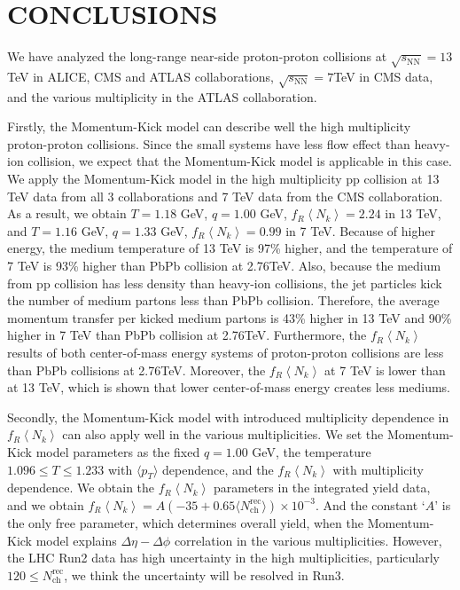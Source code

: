 \documentclass[jkps,fleqn,showpacs,showkeys]{revtex4}
\begin{document}
\section*{CONCLUSIONS}
\label{sec:Conclusion}


We have analyzed the long-range near-side proton-proton collisions at $\sqrt{s_\text{NN}}=13$TeV in ALICE, CMS and ATLAS collaborations\cite{alice, cms, atlas}, $\sqrt{s_\text{NN}}=7$TeV in CMS data\cite{cms}, and the various multiplicity in the ATLAS collaboration\cite{atlas}.

Firstly, the Momentum-Kick model can describe well the high multiplicity proton-proton collisions.
Since the small systems have less flow effect than heavy-ion collision, we expect that the Momentum-Kick model is applicable in this case.
We apply the Momentum-Kick model in the high multiplicity pp collision at 13 TeV data from all 3 collaborations and 7 TeV data from the CMS collaboration. 
As a result, we obtain $T=1.18$ GeV, $q=1.00$ GeV, $f_R\left\langle N_k \right\rangle = 2.24$ in 13 TeV, and $T=1.16$ GeV, $q=1.33$ GeV, $f_R\left\langle N_k \right\rangle = 0.99$ in 7 TeV.
Because of higher energy, the medium temperature of 13 TeV is 97\% higher, and the temperature of 7 TeV is 93\% higher than PbPb collision at 2.76TeV.
Also, because the medium from pp collision has less density than heavy-ion collisions, the jet particles kick the number of medium partons less than PbPb collision.
Therefore, the average momentum transfer per kicked medium partons is 43\% higher in 13 TeV and 90\% higher in 7 TeV than PbPb collision at 2.76TeV.
Furthermore, the $f_R\left\langle N_k \right\rangle$ results of both center-of-mass energy systems of proton-proton collisions are less than PbPb collisions at 2.76TeV.
Moreover, the $f_R\left\langle N_k \right\rangle$ at 7 TeV is lower than at 13 TeV, which is shown that lower center-of-mass energy creates less mediums.


Secondly, the Momentum-Kick model with introduced multiplicity dependence in $f_R\left\langle N_k\right\rangle$ can also apply well in the various multiplicities.
We set the Momentum-Kick model parameters as the fixed $q=1.00$ GeV, the temperature $1.096\leq T \leq 1.233$ with $\langle p_T \rangle$ dependence, and the $f_R\left\langle N_k \right\rangle$ with multiplicity dependence.
We obtain the $f_R\left\langle N_k \right\rangle$ parameters in the integrated yield data, and we obtain $f_R\left\langle N_k \right\rangle = A(-35+0.65\langle N_{\text{ch}}^{\text{rec}}\rangle)\times10^{-3}$.
And the constant `$A$' is the only free parameter, which determines overall yield, when the Momentum-Kick model explains $\Delta\eta-\Delta\phi$ correlation in the various multiplicities.
However, the LHC Run2 data has high uncertainty in the high multiplicities, particularly $120\leq N_{\text{ch}}^{\text{rec}}$, we think the uncertainty will be resolved in Run3.
\end{document}
